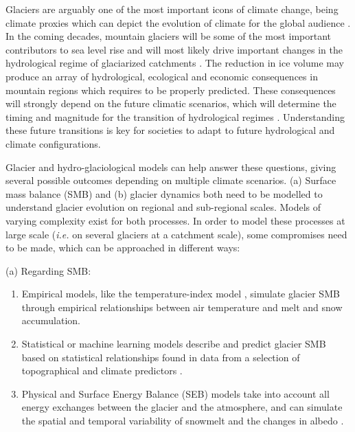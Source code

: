 Glaciers are arguably one of the most important icons of climate change, being climate proxies which can depict the evolution of climate for the global audience \citep{ipcc_climate_2018}. In the coming decades, mountain glaciers will be some of the most important contributors to sea level rise and will most likely drive important changes in the hydrological regime of glaciarized catchments \citep{beniston_european_2018, vuille_rapid_2018, hock_glaciermip_2019}. The reduction in ice volume may produce an array of hydrological, ecological and economic consequences in mountain regions which requires to be properly predicted. These consequences will strongly depend on the future climatic scenarios, which will determine the timing and magnitude for the transition of hydrological regimes \citep{huss_global-scale_2018}. Understanding these future transitions is key for societies to adapt to future hydrological and climate configurations. 

Glacier and hydro-glaciological models can help answer these questions, giving several possible outcomes depending on multiple climate scenarios. (a) Surface mass balance (SMB) and (b) glacier dynamics both need to be modelled to understand glacier evolution on regional and sub-regional scales. Models of varying complexity exist for both processes. In order to model these processes at large scale (\textit{i.e.} on several glaciers at a catchment scale), some compromises need to be made, which can be approached in different ways:

(a) Regarding SMB:

\begin{enumerate}
\item Empirical models, like the temperature-index model \citep[e.g.][]{hock_temperature_2003}, simulate glacier SMB through empirical relationships between air temperature and melt and snow accumulation. 
\item Statistical or machine learning models describe and predict glacier SMB based on statistical relationships found in data from a selection of topographical and climate predictors \citep[e.g.][]{martin_correlation_1974, steiner_application_2005}.
\item Physical and Surface Energy Balance (SEB) models take into account all energy exchanges between the glacier and the atmosphere, and can simulate the spatial and temporal variability of snowmelt and the changes in albedo \citep[e.g.][]{gerbaux_surface_2005}.
\end{enumerate}

